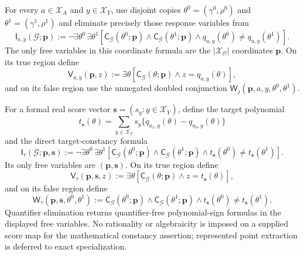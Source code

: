 For every \(a\in\mathcal X_A\) and \(y\in\mathcal X_Y\), use disjoint copies \(\theta^0=(\gamma^0,\rho^0)\) and \(\theta^1=(\gamma^1,\rho^1)\) and eliminate precisely those response variables from
\[
\mathsf I_{a,y}(\mathcal G;\mathbf p):=
\neg\exists\theta^0\,\exists\theta^1
\left[
\mathsf C_{\mathcal G}(\theta^0;\mathbf p)
\wedge\mathsf C_{\mathcal G}(\theta^1;\mathbf p)
\wedge q_{a,y}(\theta^0)\neq q_{a,y}(\theta^1)
\right].
\]
The only free variables in this coordinate formula are the \(|\mathcal X_{\mathcal O}|\) coordinates \(\mathbf p\). On its true region define
\[
\mathsf V_{a,y}(\mathbf p,z):=
\exists\theta
\left[
\mathsf C_{\mathcal G}(\theta;\mathbf p)
\wedge z=q_{a,y}(\theta)
\right],
\]
and on its false region use the unnegated doubled conjunction \(\mathsf W_j(\mathbf p,a,y,\theta^0,\theta^1)\).

For a formal real score vector \(\mathbf s=(s_y:y\in\mathcal X_Y)\), define the target polynomial
\[
t_{\mathbf s}(\theta)
=\sum_{y\in\mathcal X_Y}s_y
\{q_{a_1,y}(\theta)-q_{a_0,y}(\theta)\}
\]
and the direct target-constancy formula
\[
\mathsf I_{\tau}(\mathcal G;\mathbf p,\mathbf s):=
\neg\exists\theta^0\,\exists\theta^1
\left[
\mathsf C_{\mathcal G}(\theta^0;\mathbf p)
\wedge\mathsf C_{\mathcal G}(\theta^1;\mathbf p)
\wedge t_{\mathbf s}(\theta^0)\neq t_{\mathbf s}(\theta^1)
\right].
\]
Its only free variables are \((\mathbf p,\mathbf s)\). On its true region define
\[
\mathsf V_{\tau}(\mathbf p,\mathbf s,z):=
\exists\theta
\left[
\mathsf C_{\mathcal G}(\theta;\mathbf p)
\wedge z=t_{\mathbf s}(\theta)
\right],
\]
and on its false region define
\[
\mathsf W_{\tau}(\mathbf p,\mathbf s,\theta^0,\theta^1):=
\mathsf C_{\mathcal G}(\theta^0;\mathbf p)
\wedge\mathsf C_{\mathcal G}(\theta^1;\mathbf p)
\wedge t_{\mathbf s}(\theta^0)\neq t_{\mathbf s}(\theta^1).
\]
Quantifier elimination returns quantifier-free polynomial-sign formulas in the displayed free variables. No rationality or algebraicity is imposed on a supplied score map for the mathematical constancy assertion; represented point extraction is deferred to exact specialization.